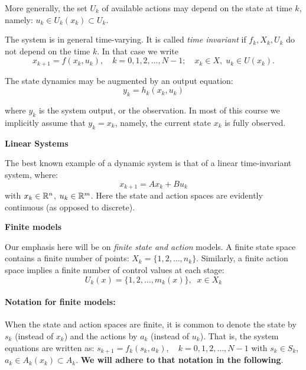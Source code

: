 \begin{remark}
 	More generally, the set $U_k$ of available actions may depend on the state at time $k$, namely: ${u_k} \in {U_k}({x_k}) \subset {U_k}$.
\end{remark}
\begin{remark}
 	The system is in general time-varying. It is called \emph{time invariant} if ${f_k},{X_k},{U_k}$ do not depend on the time $k$. In that case we write
\[{x_{k + 1}} = f({x_k},{u_k}),\quad k = 0,1,2, \ldots ,N - 1;\quad {x_k} \in X,\;{u_k} \in U({x_k}).\]
\end{remark}
\begin{remark}
 	The state dynamics may be augmented by an output equation:
\[{y_k} = {h_k}({x_k},{u_k})\]
\end{remark}
where  $y_k$ is the system output, or the observation. In most of this course we  implicitly assume that $y_k=x_k$, namely, the current state $x_k$ is fully observed.

\begin{example}{\textbf{Linear Systems}}

The best known example of a dynamic system is that of a linear time-invariant system, where:
\[{x_{k + 1}} = A{x_k} + B{u_k}\]
with ${x_k} \in \mathbb{R}^n$, $u_k \in \mathbb{R}^m$. Here the state and action spaces are evidently continuous (as opposed to discrete).
\end{example}

\begin{example}{\textbf{Finite models}}

Our emphasis here will be on \emph{finite state and action} models. A finite state space contains a finite number of points: ${X_k} = \{ 1,2, \ldots ,{n_k}\} $. Similarly, a finite action space implies a finite number of control values at each stage:
\[{U_k}(x) = \{ 1,2, \ldots ,{m_k}(x)\} ,\;\;x \in {X_k}\]
\end{example}

\paragraph{Notation for finite models:}  When the state and action spaces are finite, it is common to denote the state by ${s_k}$ (instead of ${x_k}$) and the actions by ${a_k}$ (instead of ${u_k}$). That is, the system equations are written as:
${s_{k + 1}} = {f_k}({s_k},{a_k}),\quad k = 0,1,2, \ldots ,N - 1$
with ${s_k} \in {S_k}$, ${a_k} \in {A_k}({x_k}) \subset {A_k}$.  \textbf{We will adhere to that notation in the following}.


